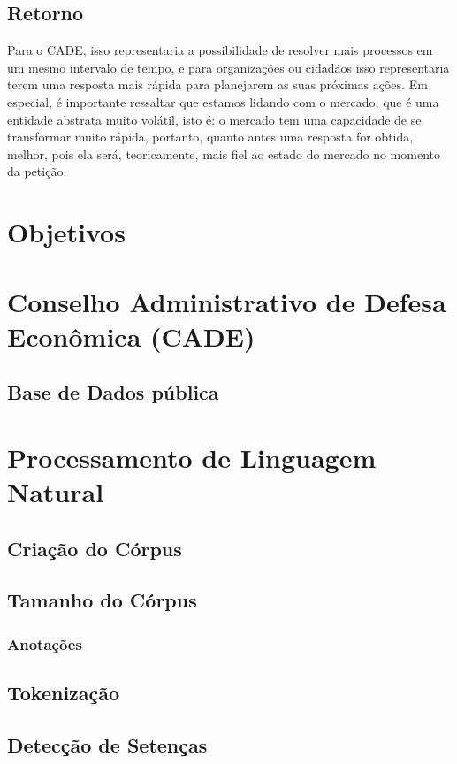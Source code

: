 \documentclass[11pt]{report}
\begin{document}
\subsection{Retorno}

\indent\indent Para o CADE, isso representaria a possibilidade de resolver mais processos em um mesmo intervalo de tempo, e para organizações ou cidadãos isso representaria
terem uma resposta mais rápida para planejarem as suas próximas ações. Em especial, é importante ressaltar que estamos lidando com o mercado, que é uma
entidade abstrata muito volátil, isto é: o mercado tem uma capacidade de se transformar muito rápida, portanto, quanto antes uma resposta for obtida, melhor, pois ela será,
teoricamente, mais fiel ao estado do mercado no momento da petição.



\section{Objetivos}



\pagebreak
\section{Conselho Administrativo de Defesa Econômica (CADE)}
\subsection{Base de Dados pública}

\pagebreak
\section{Processamento de Linguagem Natural}
\subsection{Criação do Córpus}
\subsection{Tamanho do Córpus}
\subsubsection{Anotações}
\subsection{Tokenização}
\subsection{Detecção de Setenças}
\end{document}
